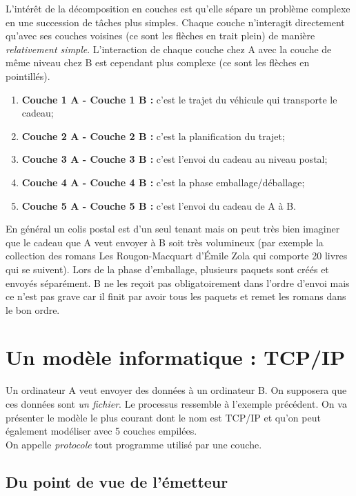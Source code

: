 \documentclass[a4paper,12pt]{book}
\begin{document}
L'intérêt de la décomposition en couches est qu'elle sépare un problème complexe en une succession de tâches plus simples. Chaque couche n'interagit directement qu'avec ses couches voisines (ce sont les flèches en trait plein) de manière \textit{relativement simple}. L'interaction de chaque couche chez A avec la couche de même niveau chez B est cependant plus complexe (ce sont les flèches en pointillés).

\begin{enumerate}[]
	\item 	\textbf{Couche 1 A - Couche 1 B :} c'est le trajet du véhicule qui transporte le cadeau;
	\item 	\textbf{Couche 2 A - Couche 2 B :} c'est la planification du trajet;
	\item 	\textbf{Couche 3 A - Couche 3 B :} c'est l'envoi du cadeau au niveau postal;
	\item 	\textbf{Couche 4 A - Couche 4 B :} c'est la phase emballage/déballage;
	\item 	\textbf{Couche 5 A - Couche 5 B :} c'est l'envoi du cadeau de A à B.
\end{enumerate}


En général un colis postal est d'un seul tenant mais on peut très bien imaginer que le cadeau que A veut envoyer à B soit très volumineux (par exemple la collection des  romans \og Les Rougon-Macquart\fg{} d'\'Emile Zola qui comporte 20 livres qui se suivent). Lors de la phase d'emballage, plusieurs \og paquets\fg{} sont créés et envoyés séparément. B ne les reçoit pas obligatoirement dans l'ordre d'envoi mais ce n'est pas grave car il finit par avoir tous les paquets et remet les romans dans le bon ordre.

\section*{Un modèle informatique : TCP/IP}


Un ordinateur A veut envoyer des données à un ordinateur B. On supposera que ces données sont \textit{un fichier}. Le processus ressemble à l'exemple précédent. On va présenter le modèle le plus courant dont le nom est TCP/IP et qu'on peut également modéliser avec 5 couches empilées.\\
On appelle \textit{protocole} tout programme utilisé par une couche.\\

\subsection*{Du point de vue de l'émetteur}
\end{document}
